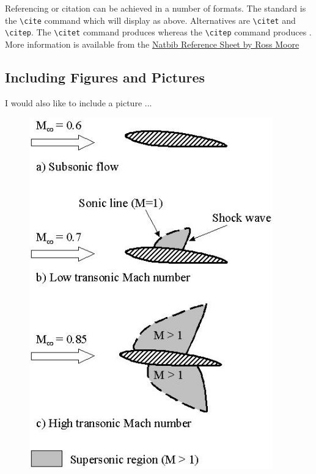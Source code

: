 Referencing or citation can be achieved in a number of formats.  The standard is the \verb|\cite| command which will display as above.  Alternatives are \verb|\citet| and   \verb|\citep|.  The \verb|\citet| command produces \citet{KR83} whereas the \verb|\citep| command produces \citep{latex}.  More information is available from the  \href{http://merkel.zoneo.net/Latex/natbib.php}{Natbib Reference Sheet by Ross Moore}

\subsection{Including Figures and Pictures}


I would also like to include a picture ...

\begin{figure}[!htbp]
  \begin{center}
    \leavevmode
    \ifpdf
      \includegraphics[height=6in]{aflow}
    \else

\end{center}
\end{figure}
